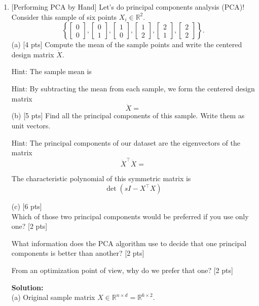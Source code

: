 \documentclass[10pt]{article}
\begin{document}
\begin{enumerate}[1.]
\newpage
 \item {} [Performing PCA by Hand]
 Let's do principal components analysis (PCA)! Consider this sample of six points $X_i \in \mathbb{R}^2$.
$$
\left\{\left[\begin{array}{l}
0 \\
0
\end{array}\right],\left[\begin{array}{l}
0 \\
1
\end{array}\right],\left[\begin{array}{l}
1 \\
0
\end{array}\right],\left[\begin{array}{l}
1 \\
2
\end{array}\right],\left[\begin{array}{l}
2 \\
1
\end{array}\right],\left[\begin{array}{l}
2 \\
2
\end{array}\right]\right\} .
$$
(a) [4 pts] Compute the mean of the sample points and write the centered design matrix $\dot{X}$.

Hint: The sample mean is


Hint: By subtracting the mean from each sample, we form the centered design matrix
$$
\dot{X}=
$$
(b) [5 pts] Find all the principal components of this sample. Write them as unit vectors.

Hint: The principal components of our dataset are the eigenvectors of the matrix
$$
\dot{X}^{\top} \dot{X}=
$$

The characteristic polynomial of this symmetric matrix is
$$
\operatorname{det}\left(s I-X^{\top} X\right)
$$

(c) [6 pts]\\
Which of those two principal components would be preferred if you use only one? [2 pts]\par
What information does the PCA algorithm use to decide that one principal components is better than another? [2 pts]\par
From an optimization point of view, why do we prefer that one? [2 pts]\par

\textbf{Solution:}\\
(a) 
Original sample matrix $X\in \mathbb{R}^{n\times d}=\mathbb{R}^{6\times 2}$.\\


\end{enumerate}
\end{document}

